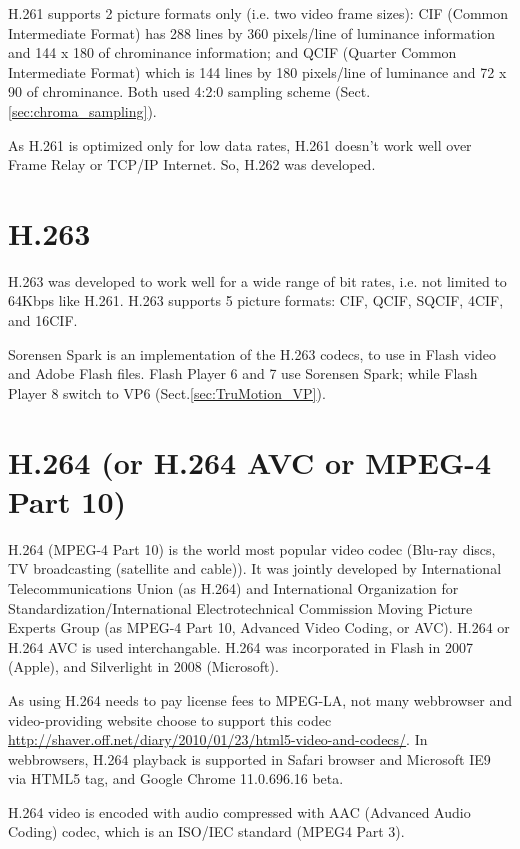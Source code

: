 H.261 supports 2 picture formats only (i.e. two video frame sizes): CIF (Common
Intermediate Format) has 288 lines by 360 pixels/line of luminance information
and 144 x 180 of chrominance information; and QCIF (Quarter Common Intermediate
Format) which is 144 lines by 180 pixels/line of luminance and 72 x 90 of
chrominance. Both used 4:2:0 sampling scheme (Sect.\ref{sec:chroma_sampling}).


As H.261 is optimized only for low data rates, H.261 doesn't work well over
Frame Relay or TCP/IP Internet. So, H.262 was developed.

\section{H.263}

H.263 was developed to work well for a wide range of bit rates, i.e. not limited
to 64Kbps like H.261. H.263 supports 5 picture formats: CIF, QCIF, SQCIF, 4CIF,
and 16CIF. 

Sorensen Spark is an implementation of the H.263 codecs, to use in Flash video
and Adobe Flash files. Flash Player 6 and 7 use Sorensen Spark; while Flash
Player 8 switch to VP6 (Sect.\ref{sec:TruMotion_VP}).


\section{H.264 (or H.264 AVC or MPEG-4 Part 10)}
\label{sec:H.264_AVC}

H.264 (MPEG-4 Part 10) is the world most popular video codec (Blu-ray discs, TV
broadcasting (satellite and cable)). It was jointly developed by International
Telecommunications Union (as H.264) and International Organization for
Standardization/International Electrotechnical Commission Moving Picture Experts
Group (as MPEG-4 Part 10, Advanced Video Coding, or AVC). H.264 or H.264 AVC is
used interchangable. H.264 was incorporated in Flash in 2007 (Apple), and
Silverlight in 2008 (Microsoft). 

As using H.264 needs to pay license fees to MPEG-LA, not many webbrowser and
video-providing website choose to support this codec
\url{http://shaver.off.net/diary/2010/01/23/html5-video-and-codecs/}. In
webbrowsers, H.264 playback is supported in Safari browser and Microsoft IE9 via HTML5 tag, and Google Chrome 11.0.696.16
beta.

H.264 video is encoded with audio compressed with AAC (Advanced Audio Coding)
codec, which is an ISO/IEC standard (MPEG4 Part 3).

